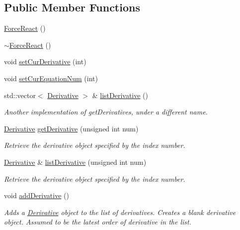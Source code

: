 \subsection*{Public Member Functions}
\begin{DoxyCompactItemize}
\item 
\hyperlink{classosea_1_1ofreq_1_1_force_react_ac8f8b24f67f93f43ae1bb9c464a2d8d4}{Force\-React} ()
\item 
\hyperlink{classosea_1_1ofreq_1_1_force_react_a585f55d5c31c4951824bce98b6582afb}{$\sim$\-Force\-React} ()
\item 
void \hyperlink{classosea_1_1ofreq_1_1_force_react_ac387126f0628a06b24f53012725e384f}{set\-Cur\-Derivative} (int)
\item 
void \hyperlink{classosea_1_1ofreq_1_1_force_react_aca5dc15ce68dd63183aced244c13992c}{set\-Cur\-Equation\-Num} (int)
\item 
std\-::vector$<$ \hyperlink{classosea_1_1ofreq_1_1_derivative}{Derivative} $>$ \& \hyperlink{classosea_1_1ofreq_1_1_force_react_a3c399af8c10b2dbf374c13d85917275e}{list\-Derivative} ()
\begin{DoxyCompactList}\small\item\em Another implementation of get\-Derivatives, under a different name. \end{DoxyCompactList}\item 
\hyperlink{classosea_1_1ofreq_1_1_derivative}{Derivative} \hyperlink{classosea_1_1ofreq_1_1_force_react_aaa5876da8ade31366fc75e3bb5d6ba42}{get\-Derivative} (unsigned int num)
\begin{DoxyCompactList}\small\item\em Retrieve the derivative object specified by the index number. \end{DoxyCompactList}\item 
\hyperlink{classosea_1_1ofreq_1_1_derivative}{Derivative} \& \hyperlink{classosea_1_1ofreq_1_1_force_react_a9966751cff2a417cfe04658a0038aa1b}{list\-Derivative} (unsigned int num)
\begin{DoxyCompactList}\small\item\em Retrieve the derivative object specified by the index number. \end{DoxyCompactList}\item 
void \hyperlink{classosea_1_1ofreq_1_1_force_react_a1aad01d74720d18fd21dd9f70a8b6702}{add\-Derivative} ()
\begin{DoxyCompactList}\small\item\em Adds a \hyperlink{classosea_1_1ofreq_1_1_derivative}{Derivative} object to the list of derivatives. Creates a blank derivative object. Assumed to be the latest order of derivative in the list. \end{DoxyCompactList}\item 

\end{DoxyCompactItemize}
